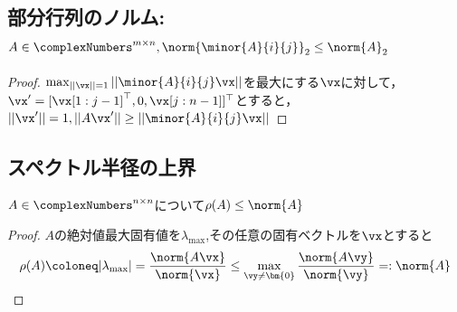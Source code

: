         \subsection{部分行列のノルム: \texorpdfstring{$A\in\complexNumbers^{m\times n}, \norm{\minor{A}{i}{j}}_2 \leq \norm{A}_2$}{A∈C\string^(n×n), ||A[∖i][∖j]||\_2 ≤ ||A||\_2}}
            \begin{proof}
                $\max_{||\vx||=1}||\minor{A}{i}{j}\vx||$を最大にする$\vx$に対して，$\vx' = [\vx[1:j-1]^\top,0,\vx[j:n-1]]^\top$とすると，$||\vx'|| = 1,||A\vx'|| \geq ||\minor{A}{i}{j}\vx||$
            \end{proof}
        \subsection{スペクトル半径の上界}
            \begin{shadebox}
                $A\in\complexNumbers^{n\times n}$について$\rho(A)\leq\norm{A}$
            \end{shadebox}
            \begin{proof}
                $A$の絶対値最大固有値を$\lambda_{\mathrm{max}}$,その任意の固有ベクトルを$\vx$とすると
                \[\rho(A) \coloneq |\lambda_\mathrm{max}| = \frac{\norm{A\vx}}{\norm{\vx}} \leq \max_{\vy\neq\bm{0}}\frac{\norm{A\vy}}{\norm{\vy}} =: \norm{A}\]
            \end{proof}
